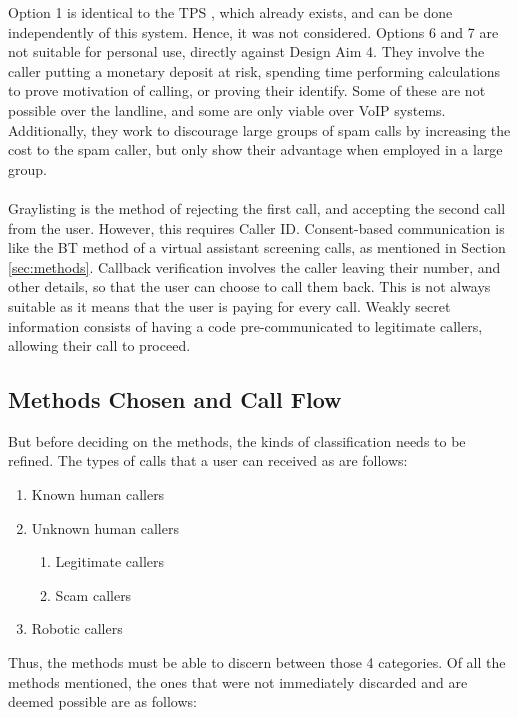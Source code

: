 \documentclass[main.tex]{subfiles}
\begin{document}
Option 1 is identical to the TPS \cite{tps}, which already exists, and can be done independently of this system. Hence, it was not considered. Options 6 and 7 are not suitable for personal use, directly against Design Aim 4. They involve the caller putting a monetary deposit at risk, spending time performing calculations to prove motivation of calling, or proving their identify. Some of these are not possible over the landline, and some are only viable over VoIP systems. Additionally, they work to discourage large groups of spam calls by increasing the cost to the spam caller, but only show their advantage when employed in a large group.
\\\\
Graylisting is the method of rejecting the first call, and accepting the second call from the user. However, this requires Caller ID. Consent-based communication is like the BT method of a virtual assistant screening calls, as mentioned in Section \ref{sec:methods}. Callback verification involves the caller leaving their number, and other details, so that the user can choose to call them back. This is not always suitable as it means that the user is paying for every call. Weakly secret information consists of having a code pre-communicated to legitimate callers, allowing their call to proceed.

\subsection{Methods Chosen and Call Flow}

But before deciding on the methods, the kinds of classification needs to be refined. The types of calls that a user can received as are follows:

\begin{enumerate}
	\item Known human callers
	\item Unknown human callers
	\begin{enumerate}
		\item Legitimate callers
		\item Scam callers
	\end{enumerate}
	\item Robotic callers
\end{enumerate}

Thus, the methods must be able to discern between those 4 categories. Of all the methods mentioned, the ones that were not immediately discarded and are deemed possible are as follows:
\end{document}

